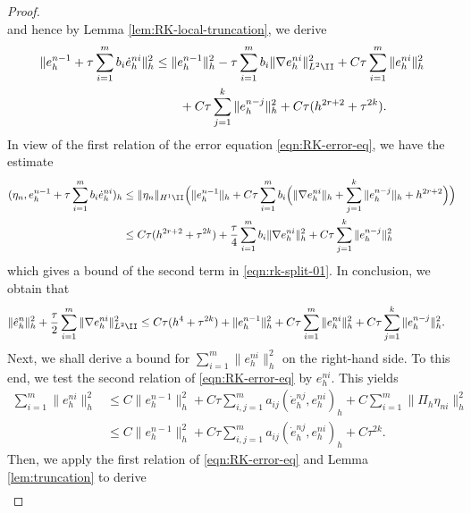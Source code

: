 \begin{proof}
\begin{equation*}
\end{equation*}
and hence by Lemma \ref{lem:RK-local-truncation}, we derive
\begin{align*}
\|e_h^{n-1}+\tau\sum_{i=1}^{m} b_i\dot{e}_h^{ni}\|_h^2
&\leq \|e_h^{n-1}\|_h^2 - \tau\sum_{i=1}^{m}b_i \| \nabla e_h^{ni}  \|_{L^2\II}^2 + C\tau \sum_{i=1}^m  \|  e_h^{ni} \|_h^2 \\
&\qquad + C\tau \sum_{j=1}^k \| e_h^{n-j} \|_h^2 + C \tau(h^{2r+2}+\tau^{2k}).
\end{align*}
In view of the first relation of the error equation \eqref{eqn:RK-error-eq}, we have the estimate
\begin{align*}
(\eta_{n}, e_h^{n-1}+ \tau\sum_{i=1}^{m} b_i\dot{e}_h^{ni})_h
&\le \| \eta_n  \|_{H^1\II} \Big( \|e_h^{n-1}\|_h + C \tau  \sum_{i=1}^m b_i
\Big(\| \nabla e_h^{ni} \|_h + \sum_{j=1}^{k} \|  e_h^{n-j} \|_h  + h^{2r+2}\Big)\Big)\\
&\le C\tau(h^{2r+2}+ \tau^{2k})   + \frac{\tau}{4}   \sum_{i=1}^{m} b_i  \| \nabla e_h^{ni} \|_h^2
+ C\tau  \sum_{j=1}^{k} \|  e_h^{n-j} \|_h^2
\end{align*}
which gives a bound of the second term in \eqref{eqn:rk-split-01}. In conclusion, we obtain that
\begin{equation}\label{eqn:rk-est-02}
\begin{split}
 \|\hat e_h^{n}\|_h^2 + \frac\tau2 \sum_{i=1}^m \| \nabla e_h^{ni} \|_{L^2\II}^2& \le  C\tau(h^4+ \tau^{2k}) +  \|e_h^{n-1}\|_h^2
 + C \tau   \sum_{i=1}^m \|  e_h^{ni} \|_h^2 + C\tau  \sum_{j=1}^{k} \|  e_h^{n-j} \|_h^2.
\end{split}
\end{equation}
Next, we shall derive a bound for  $ \sum_{i=1}^m \|  e_h^{ni} \|_h^2 $
 on the right-hand side. To this
end, we test the second relation of  \eqref{eqn:RK-error-eq} by $e_h^{ni}$. This yields
\begin{equation*}
\begin{split}
 \sum_{i=1}^m \|e_h^{ni}\|_h^2 & \le C \|  e_h^{n-1} \|_h^2 + C\tau\sum_{i,j=1}^m a_{ij}(\dot e_h^{nj},e_h^{ni})_h + C\sum_{i=1}^m \| \Pi_h \eta_{ni} \|_h^2\\
& \le  C \|  e_h^{n-1} \|_h^2 + C\tau\sum_{i,j=1}^m a_{ij}(\dot e_h^{nj},e_h^{ni}) _h + C\tau^{2k}.
\end{split}
\end{equation*}
Then, we apply the first relation of  \eqref{eqn:RK-error-eq} and Lemma \ref{lem:truncation} to derive
\begin{equation*}
\begin{split}

\end{split}
\end{equation*}
\end{proof}

